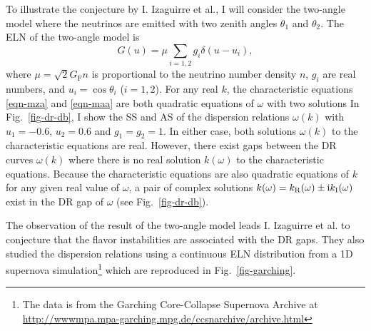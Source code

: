 
To illustrate the conjecture by I. Izaguirre et al., I will consider the two-angle model where the neutrinos are emitted with two zenith angles $\theta_1$ and $\theta_2$. The ELN of the two-angle model is
\begin{equation}
G(u)= \mu \sum_{i=1,2} g_i \delta(u - u_i),
\end{equation}
where $\mu = \sqrt{2}G_{\mathrm F} n$ is proportional to the neutrino number density $n$, $g_i$ are real numbers, and $u_i=\cos \theta_i$ ($i=1,2$). For any real $k$, the characteristic equations \eqref{eqn-mza} and \eqref{eqn-maa} are both quadratic equations of $\omega$ with two solutions
In Fig.~\ref{fig-dr-db}, I show the SS and AS of the dispersion relations $\omega(k)$ with $u_1=-0.6$, $u_2=0.6$ and $g_1=g_2=1$. In either case, both solutions $\omega(k)$ to the characteristic equations are real. However, there exist gaps between the DR curves $\omega(k)$ where there is no real solution $k(\omega)$ to the characteristic equations. Because the characteristic equations are also quadratic equations of $k$ for any given real value of $\omega$, a pair of complex solutions $k (\omega) = k_{\mathrm R} (\omega) \pm \mathrm{i} k_{\mathrm I}(\omega)$ exist in the DR gap of $\omega$ (see Fig.~\ref{fig-dr-db}).

The observation of the result of the two-angle model leads I. Izaguirre et al. to conjecture that the flavor instabilities are associated with the DR gaps. They also studied the dispersion relations using a continuous ELN distribution from a 1D supernova simulation\footnote{The data is from the Garching Core-Collapse Supernova Archive at \url{http://wwwmpa.mpa-garching.mpg.de/ccsnarchive/archive.html} } which are reproduced in Fig.~\ref{fig-garching}.

